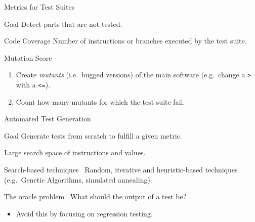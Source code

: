 \documentclass{beamer}
\begin{document}
\begin{frame}{Metrics for Test Suites}
  \begin{block}{Goal}
    Detect parts that are not tested.
  \end{block}

  \pause{}

  \begin{exampleblock}{Code Coverage}
    Number of instructions or branches executed by the test suite.
  \end{exampleblock}

  \pause{}

  \begin{exampleblock}{Mutation Score}
    \begin{enumerate}
      \item Create \emph{mutants} (i.e.\ bugged versions) of the main software (e.g.\ change a \texttt{>} with a \texttt{<=}).
      \item Count how many mutants for which the test suite fail.
    \end{enumerate}
  \end{exampleblock}
\end{frame}

\begin{frame}{Automated Test Generation}
  \begin{block}{Goal}
    Generate tests from scratch to fulfill a given metric.

    Large search space of instructions and values.
  \end{block}

  \begin{exampleblock}{Search-based techniques~\cite{harman2001search,mcminn2011search,fraser2011evosuite}}
    Random, iterative and heuristic-based techniques (e.g.\ Genetic Algorithms, simulated annealing).
  \end{exampleblock}

  \pause{}

  \begin{block}{The oracle problem~\cite{barr2015oracle}}
    What should the output of a test be?

    \begin{itemize}
      \item Avoid this by focusing on regression testing.
    \end{itemize}
  \end{block}
\end{frame}
\end{document}
